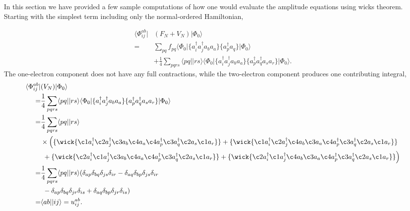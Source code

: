 \documentclass[
    a4paper, aps, twocolumn, floatfix, superscriptaddress,
    nofootinbib]{revtex4-1}
\newcommand{\1}{\mathds{1}}
\newcommand{\bra}[1]{\langle #1\lvert}
\newcommand{\ket}[1]{\rvert #1\rangle}
\begin{document}
    \label{app:wickOnAmplitude}

    In this section we have provided a few sample computations of how one would
    evaluate the amplitude equations using wicks theorem. Starting with the simplest
    term including only the normal-ordered Hamiltonian,

    \begin{equation}
        \begin{aligned}
            \bra{\Phi_{ij}^{ab}} &(F_N + V_N)\ket{\Phi_0} \\
             =& \sum_{pq}f_{pq}\bra{\Phi_0}\{a_i^\dagger a_j^\dagger a_ba_a\}\{a^\dagger_pa_q\}\ket{\Phi_0} \\
             &+\frac{1}{4}\sum_{pqrs}\bra{pq}\ket{rs}
             \bra{\Phi_0}\{a_i^\dagger a_j^\dagger a_ba_a\}\{a^\dagger_pa^\dagger_qa_sa_r\}\ket{\Phi_0}.
        \end{aligned}
        \end{equation}
        The one-electron component does not have any full contractions, while the
        two-electron component produces one contributing integral,
        \begin{equation}
        \begin{aligned}
            \bra{\Phi_{ij}^{ab}} &(V_N)\ket{\Phi_0} \\
                =& \frac{1}{4}\sum_{pqrs}\bra{pq}\ket{rs}
             \bra{\Phi_0}\{a_i^\dagger a_j^\dagger a_ba_a\}\{a^\dagger_pa^\dagger_qa_sa_r\}\ket{\Phi_0} \\
                 =& \frac{1}{4} \sum_{pqrs} \bra{pq}\ket{rs} \\ &\times\Big(
                     \{ \wick{\c1 a^\dagger_i \c2 a^\dagger_j \c3 a_b \c4 a_a
                     \c4 a^\dagger_p \c3 a^\dagger_q \c2 a_s \c1 a_r}\}
                     +
                     \{ \wick{\c1 a^\dagger_i \c2 a^\dagger_j \c4 a_b \c3 a_a
                     \c4 a^\dagger_p \c3 a^\dagger_q \c2 a_s \c1 a_r}\} \\
                   &\ +
                      \{ \wick{\c2 a^\dagger_i \c1 a^\dagger_j \c3 a_b \c4 a_a
                     \c4 a^\dagger_p \c3 a^\dagger_q \c2 a_s \c1 a_r}\}
                     +
                     \{ \wick{\c2 a^\dagger_i \c1 a^\dagger_j \c4 a_b \c3 a_a
                     \c4 a^\dagger_p \c3 a^\dagger_q \c2 a_s \c1 a_r}\}
                 \Big) \\
                 =&  \frac{1}{4} \sum_{pqrs} \bra{pq}\ket{rs}
                 ( \delta_{ap}\delta_{bq}\delta_{js}\delta_{ir}
                  -\delta_{aq}\delta_{bp}\delta_{js}\delta_{ir} \\
                 &\ -\delta_{ap}\delta_{bq}\delta_{jr}\delta_{is}
                  +\delta_{aq}\delta_{bp}\delta_{jr}\delta_{is}) \\
                  =& \bra{ab}\ket{ij} = u^{ab}_{ij}.
        \end{aligned}
        \end{equation}
\end{document}
